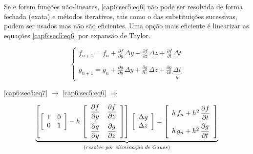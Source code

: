Se  e  forem funções não-lineares, \ref{cap6:sec5:eq6} não pode ser resolvida de forma fechada (exata) e métodos iterativos, tais como o das substituições sucessivas, podem ser usados mas não são eficientes. Uma opção mais eficiente é linearizar as equações \ref{cap6:sec5:eq6} por expansão de Taylor.

\begin{equation}
 \label{cap6:sec5:eq7}
 \left\{
 \begin{array}{l}
  f_{n+1} = f_n + \displaystyle \frac{\partial f}{\partial y} \, \Delta y + \frac{\partial f}{\partial z} \, \Delta z + \frac{\partial f}{\partial t} \, \Delta t \\
  \\
  g_{n+1} = g_n + \displaystyle \frac{\partial g}{\partial y} \, \Delta y + \frac{\partial g}{\partial z} \, \Delta z + \frac{\partial g}{\partial t} \, \underbrace{\Delta t}_{\displaystyle h}
 \end{array}
 \right.
\end{equation}

\ref{cap6:sec5:eq7} $ \rightarrow $ \ref{cap6:sec5:eq6} $ \Rightarrow $

\begin{equation}
 \label{cap6:sec5:eq8}
 \underbrace{
 \left[
  \left[
   \begin{array}{cc}
    1 & 0 \\
    0 & 1 \\
   \end{array}
  \right]
  - h \,
  \left[
   \begin{array}{cc}
    \displaystyle \frac{\partial f}{\partial y} & \displaystyle \frac{\partial f}{\partial z} \vspace*{0.2cm} \\
    \displaystyle \frac{\partial g}{\partial y} & \displaystyle \frac{\partial g}{\partial z}
   \end{array}
  \right]
 \right]
 \,
 \left[
  \begin{array}{c}
   \Delta y \\
   \Delta z
  \end{array}
 \right]
 =
 \left[
  \begin{array}{l}
   h \, f_n + h^2 \, \displaystyle \frac{\partial f}{\partial t} \vspace*{0.2cm} \\
   h \, g_n + h^2 \, \displaystyle \frac{\partial g}{\partial t}
  \end{array}
 \right]
 }_{(resolve \, \, por \, \, elimina\mbox{\textit{\scriptsize{çã}}}o \, \, de\, \, Gauss)}
\end{equation}

